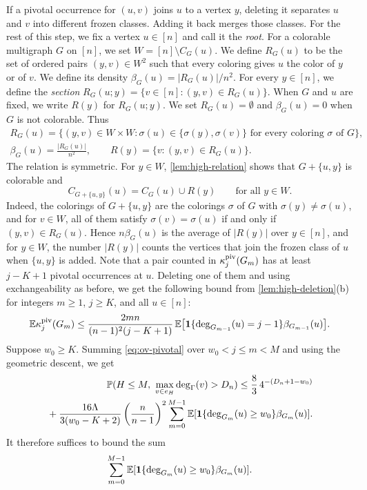 If a pivotal occurrence for $(u, v)$ joins $u$ to a vertex $y$, deleting it separates $u$ and $v$ into different frozen classes. Adding it back merges those classes. For the rest of this step, we fix a vertex $u \in [n]$ and call it the \emph{root}. For a colorable multigraph $G$ on $[n]$, we set $W = [n] \setminus C_G(u)$. We define $R_G(u)$ to be the set of ordered pairs $(y, v) \in W^2$ such that every coloring gives $u$ the color of $y$ or of $v$. We define its density $\beta_G(u) = |R_G(u)|/n^2$. For every $y \in [n]$, we define the \emph{section} $R_G(u;y) = \{v \in [n]:(y, v) \in R_G(u)\}$. When $G$ and $u$ are fixed, we write $R(y)$ for $R_G(u;y)$. We set $R_G(u) = \emptyset$ and $\beta_G(u) = 0$ when $G$ is not colorable. Thus
\begin{equation}\label{eq:ov-relation}
\begin{gathered}
R_G(u) = \bigl\{(y, v) \in W \times W : \sigma(u) \in \{\sigma(y), \sigma(v)\} \text{ for every coloring } \sigma \text{ of } G\bigr\}, \\
\beta_G(u) = \frac{|R_G(u)|}{n^2}, \qquad R(y) = \{v : (y, v) \in R_G(u)\}.
\end{gathered}
\end{equation}
The relation is symmetric. For $y \in W$, \cref{lem:high-relation} shows that $G + \{u, y\}$ is colorable and
\begin{equation}\label{eq:ov-section}
C_{G + \{u, y\}}(u) = C_G(u) \cup R(y) \qquad \text{for all } y \in W.
\end{equation}
Indeed, the colorings of $G + \{u, y\}$ are the colorings $\sigma$ of $G$ with $\sigma(y) \ne \sigma(u)$, and for $v \in W$, all of them satisfy $\sigma(v) = \sigma(u)$ if and only if $(y, v) \in R_G(u)$. Hence $n \beta_G(u)$ is the average of $|R(y)|$ over $y \in [n]$, and for $y \in W$, the number $|R(y)|$ counts the vertices that join the frozen class of $u$ when $\{u, y\}$ is added. Note that a pair counted in $\kappa_j^{\rm piv}(G_m)$ has at least $j - K + 1$ pivotal occurrences at $u$. Deleting one of them and using exchangeability as before, we get the following bound from \cref{lem:high-deletion}(b) for integers $m \ge 1$, $j \ge K$, and all $u \in [n]$:
\begin{equation}\label{eq:ov-pivotal}
\mathbb E \kappa_j^{\rm piv}(G_m) \le \frac{2mn}{(n - 1)^2 (j - K + 1)} \, \mathbb E\bigl[\mathbf 1\{\deg_{G_{m - 1}}(u) = j - 1\} \beta_{G_{m - 1}}(u)\bigr].
\end{equation}
Suppose $w_0 \ge K$. Summing \eqref{eq:ov-pivotal} over $w_0 < j \le m < M$ and using the geometric descent, we get
\[
\begin{split}
\mathbb P(H \le M, \ \max_{v \in e_H}\deg_\Gamma(v) > D_n)
\le \frac83\,4^{-(D_n + 1 - w_0)}\\
{} + \frac{16\Lambda}{3(w_0 - K + 2)}\left(\frac n{n - 1}\right)^2
\sum_{m = 0}^{M - 1}\mathbb E[\mathbf 1\{\deg_{G_m}(u) \ge w_0\}\beta_{G_m}(u)].
\end{split}
\]
It therefore suffices to bound the sum
\begin{equation}\label{eq:ov-occupation}
\sum_{m = 0}^{M - 1}\mathbb E[\mathbf 1\{\deg_{G_m}(u) \ge w_0\}\beta_{G_m}(u)].
\end{equation}

